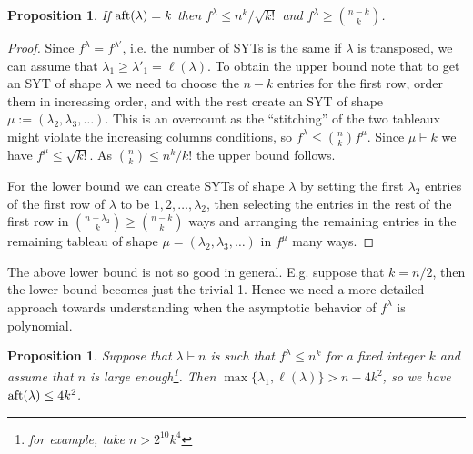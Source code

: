 \documentclass[11pt]{amsart}
\newtheorem{prop}[thm]{Proposition}
\theoremstyle{plain}
\theoremstyle{definition}
\numberwithin{equation}{section}
\newcommand{\la}{\lambda}
\def\la{\lambda}
\begin{document}
\begin{prop}\label{prop:fixed_aft2}
If ${\rm aft}(\la) =k$ then $f^\la \leq n^k/\sqrt{k!}$ and $f^\la \geq \binom{n-k}{k}$.
\end{prop}
\begin{proof}
Since $f^\la = f^{\la'}$, i.e. the number of SYTs is the same if $\lambda$ is transposed, we can assume that $\la_1 \geq \la'_1=\ell(\la)$.
To obtain the upper bound note that to get an SYT of shape $\la$ we need to choose the $n-k$ entries for the first row, order them in increasing order, and with the rest create an SYT of shape $\mu:=(\la_2,\la_3,\ldots)$. This is an overcount as the ``stitching'' of the two tableaux might violate the increasing columns conditions, so $f^\la \leq \binom{n}{k} f^\mu$. Since $\mu \vdash k$ we have $f^\mu \leq \sqrt{k!}$. As $\binom{n}{k} \leq n^k/k!$ the upper bound follows.

For the lower bound we can create SYTs of shape $\la$ by setting the first $\la_2$ entries of the first row  of $\la$ to be $1,2,\ldots,\la_2$, then selecting the entries in the rest of the first row in $\binom{n-\la_2}{k} \geq \binom{n-k}{k}$ ways and arranging the remaining entries in the remaining tableau of shape $\mu=(\la_2,\la_3,\ldots)$ in $f^\mu$ many ways.  
\end{proof}

The above lower bound is not so good in general. E.g. suppose that $k=n/2$, then the lower bound becomes just the trivial 1. Hence we need a more detailed approach towards understanding when the asymptotic behavior of $f^\la$ is polynomial.

\begin{prop}\label{prop:fixed_aft}
Suppose that $\la\vdash n$ is such that $f^\la \leq n^k $ for a fixed integer $k$ and assume that $n$ is large enough\footnote{for example, take $n>2^{10}k^4$}. Then $\max\{ \la_1 , \ell(\la)\}> n-4k^2$, so we have ${\rm aft}(\la) \leq 4k^2$. 
\end{prop}
\end{document}
